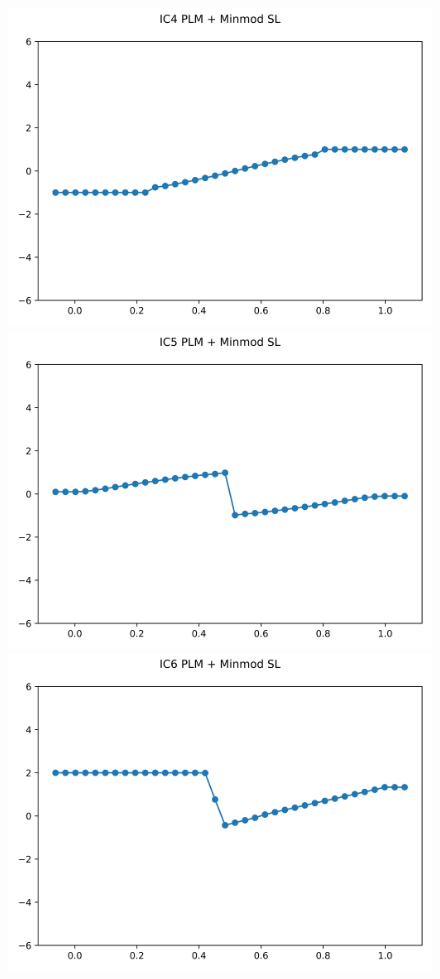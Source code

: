 \documentclass{article}
\begin{document}
\begin{figure}[t]
        \includegraphics[width=.95\textwidth]{../../code/unsafe_IC4Methodpm_plot.png}
        \includegraphics[width=.95\textwidth]{../../code/unsafe_IC5Methodpm_plot.png}
        \includegraphics[width=.95\textwidth]{../../code/unsafe_IC6Methodpm_plot.png}

\end{figure}
\end{document}
